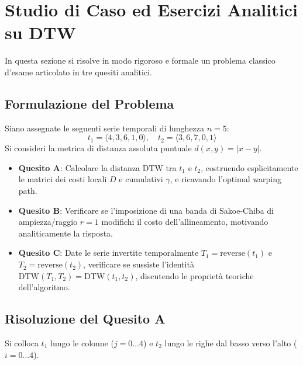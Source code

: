 \FloatBarrier
\section{Studio di Caso ed Esercizi Analitici su DTW}
\label{sec:ts-dtw-exercises}

In questa sezione si risolve in modo rigoroso e formale un problema classico d'esame articolato in tre quesiti analitici.

\FloatBarrier
\subsection{Formulazione del Problema}
\label{subsec:ts-exercise-problem}

Siano assegnate le seguenti serie temporali di lunghezza $n=5$:
\begin{equation}
\label{eq:ex-input-series}
t_1 = \langle 4, 3, 6, 1, 0 \rangle, \quad t_2 = \langle 3, 6, 7, 0, 1 \rangle
\end{equation}
Si consideri la metrica di distanza assoluta puntuale $d(x, y) = |x - y|$.
\begin{itemize}
    \item \textbf{Quesito A}: Calcolare la distanza DTW tra $t_1$ e $t_2$, costruendo esplicitamente le matrici dei costi locali $D$ e cumulativi $\gamma$, e ricavando l'optimal warping path.
    \item \textbf{Quesito B}: Verificare se l'imposizione di una banda di Sakoe-Chiba di ampiezza/raggio $r=1$ modifichi il costo dell'allineamento, motivando analiticamente la risposta.
    \item \textbf{Quesito C}: Date le serie invertite temporalmente $T_1 = \text{reverse}(t_1)$ e $T_2 = \text{reverse}(t_2)$, verificare se sussiste l'identit\`a $\text{DTW}(T_1, T_2) = \text{DTW}(t_1, t_2)$, discutendo le propriet\`a teoriche dell'algoritmo.
\end{itemize}

\FloatBarrier
\subsection{Risoluzione del Quesito A}
\label{subsec:ts-exercise-solution-a}

Si colloca $t_1$ lungo le colonne ($j=0 \dots 4$) e $t_2$ lungo le righe dal basso verso l'alto ($i=0 \dots 4$). 

